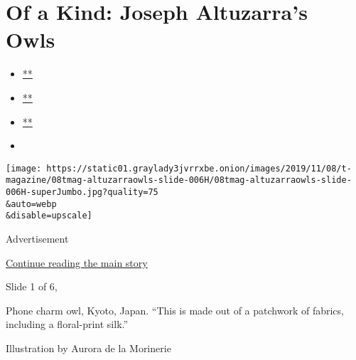 \hypertarget{of-a-kind-joseph-altuzarras-owls}{%
\section{Of a Kind: Joseph Altuzarra's
Owls}\label{of-a-kind-joseph-altuzarras-owls}}

\begin{itemize}
\item
  \href{https://www.facebookcorewwwi.onion/sharer.php?app_id=9869919170\&u=https\%3A\%2F\%2Fwww.nytimes3xbfgragh.onion\%2Fslideshow\%2F2019\%2F11\%2F08\%2Ft-magazine\%2Fof-a-kind-joseph-altuzarras-owls.html\%3Fsmid\%3Dfb-share\&name=Of\%20a\%20Kind\%3A\%20Joseph\%20Altuzarra\%E2\%80\%99s\%20Owls\&redirect_uri=https\%3A\%2F\%2Fwww.facebookcorewwwi.onion\%2F}{**}
\item
  \href{https://twitter.com/intent/tweet?url=https\%3A\%2F\%2Fwww.nytimes3xbfgragh.onion\%2Fslideshow\%2F2019\%2F11\%2F08\%2Ft-magazine\%2Fof-a-kind-joseph-altuzarras-owls.html\%3Fsmid\%3Dtw-share\&text=Of\%20a\%20Kind\%3A\%20Joseph\%20Altuzarra\%E2\%80\%99s\%20Owls}{**}
\item
  \href{mailto:?subject=nytimes3xbfgragh.onion\%3A\%20Of\%20a\%20Kind\%3A\%20Joseph\%20Altuzarra\%E2\%80\%99s\%20Owls\&body=From\%20The\%20New\%20York\%20Times\%3A\%0A\%0AOf\%20a\%20Kind\%3A\%20Joseph\%20Altuzarra\%E2\%80\%99s\%20Owls\%0A\%0AImages\%20for\%20the\%20Notes\%20on\%20the\%20Culture\%20item\%20on\%20designer\%20Joseph\%20Altuzarra\%E2\%80\%99s\%20collection\%20of\%20owls.\%0A\%0Ahttps\%3A\%2F\%2Fwww.nytimes3xbfgragh.onion\%2Fslideshow\%2F2019\%2F11\%2F08\%2Ft-magazine\%2Fof-a-kind-joseph-altuzarras-owls.html\%3Fsmid\%3Dem-share}{**}
\item
\end{itemize}

\texttt{[image: https://static01.graylady3jvrrxbe.onion/images/2019/11/08/t-magazine/08tmag-altuzarraowls-slide-006H/08tmag-altuzarraowls-slide-006H-superJumbo.jpg?quality=75\\\&auto=webp\\\&disable=upscale]}

Advertisement

\protect\hyperlink{after-right-0}{Continue reading the main story}

Slide 1 of 6,

Phone charm owl, Kyoto, Japan. ``This is made out of a patchwork of
fabrics, including a floral-print silk.''

Illustration by Aurora de la Morinerie

